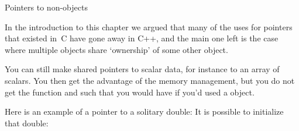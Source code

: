  {Pointers to non-objects}

In the introduction to this chapter we argued that many of the uses
for pointers that existed in~C have gone away in C++, and the main one
left is the case where multiple objects share `ownership' of some
other object.

You can still make shared pointers to scalar data, for instance to an
array of scalars. You then get the advantage of the memory management,
but you do not get the  function and such that you would have
if you'd used a  object.

Here is an example of a pointer to a solitary double:
%
%
It is possible to initialize that double:
%

